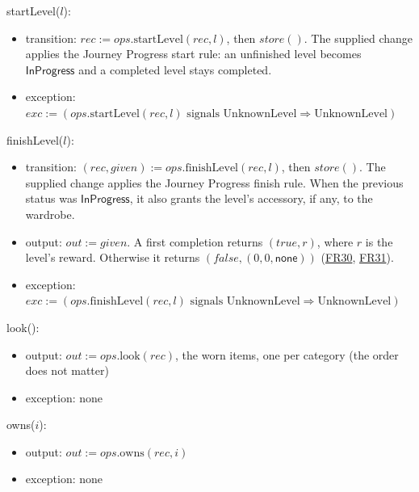 \documentclass[10pt, titlepage]{article}
\newcommand{\srsurl}{https://team-hindsight.github.io/ophthamology-game/SRS/SRS.pdf}
\newcommand{\srsitemref}[2]{\href{\srsurl\#nameddest=#1}{#2}}
\newcommand{\T}[1]{\mathit{#1}}          %
\newcommand{\V}[1]{\mathsf{#1}}          %
\newcommand{\out}{\mathit{out}}
\newcommand{\exc}{\mathit{exc}}
\newcommand{\true}{\mathit{true}}
\newcommand{\false}{\mathit{false}}
\begin{document}
\begin{samepage}
\noindent startLevel($l$):
\begin{itemize}
\item transition: $\T{rec} := \T{ops}.\text{startLevel}(\T{rec},l)$,
  then $\T{store}()$. The supplied change applies the Journey Progress
  start rule: an unfinished level becomes $\V{InProgress}$ and a
  completed level stays completed.
\item exception: $\exc := (\T{ops}.\text{startLevel}(\T{rec}, l)
  \text{ signals UnknownLevel} \Rightarrow \text{UnknownLevel})$
\end{itemize}
\end{samepage}
\par\pagebreak[0]

\begin{samepage}
\noindent finishLevel($l$):
\begin{itemize}
\item transition: $(\T{rec}, \T{given}) :=
  \T{ops}.\text{finishLevel}(\T{rec}, l)$, then $\T{store}()$.
  The supplied change applies the Journey Progress finish rule.
  When the previous status was $\V{InProgress}$, it also grants
  the level's accessory, if any, to the wardrobe.
\item output: $\out := \T{given}$. A first completion returns
  $(\true,r)$, where $r$ is the level's reward. Otherwise it returns
  $(\false,(0,0,\V{none}))$
  (\srsitemref{FR_FirstReward}{FR30},
  \srsitemref{FR_NoDuplicateReward}{FR31}).
\item exception: $\exc := (\T{ops}.\text{finishLevel}(\T{rec}, l)
  \text{ signals UnknownLevel} \Rightarrow \text{UnknownLevel})$
\end{itemize}
\end{samepage}
\par\pagebreak[0]

\begin{samepage}
\noindent look():
\begin{itemize}
\item output: $\out := \T{ops}.\text{look}(\T{rec})$, the worn items, one
  per category (the order does not matter)
\item exception: none
\end{itemize}
\end{samepage}
\par\pagebreak[0]

\begin{samepage}
\noindent owns($i$):
\begin{itemize}
\item output: $\out := \T{ops}.\text{owns}(\T{rec}, i)$
\item exception: none
\end{itemize}
\end{samepage}
\par\pagebreak[0]
\end{document}
